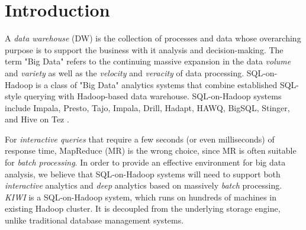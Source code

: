 \documentclass{sig-alternate-05-2015}
\begin{document}


%
%

%
%
\printccsdesc



\section{Introduction}
A \textit{data warehouse} (DW) is the collection of processes and data whose overarching purpose is to support the business with it analysis and decision-making. 
The term "Big Data" refers to the continuing massive expansion in the data \textit{volume} and \textit{variety} as well as the \textit{velocity} and \textit{veracity} of data processing.
SQL-on-Hadoop is a class of "Big Data" analytics systems that combine established SQL-style querying with Hadoop-based data warehouse.
SQL-on-Hadoop systems
include Impala, Presto,  Tajo, Impala, Drill, Hadapt, HAWQ, BigSQL, Stinger, and Hive on Tez \cite{Floratou:2014}.

For \textit{interactive queries} that require a few seconds (or even milliseconds) of response time, MapReduce (MR) is the wrong choice, since MR is often suitable for \textit{batch processing}. 
In order to provide an effective environment for big data analysis, we believe that SQL-on-Hadoop systems will need to support both \textit{interactive} analytics and \textit{deep} analytics based on massively \textit{batch} processing. 
\textit{KIWI} is a  SQL-on-Hadoop system, which runs on hundreds of machines in existing Hadoop cluster.
It is decoupled from the underlying storage engine, unlike traditional database management systems.
\end{document}
